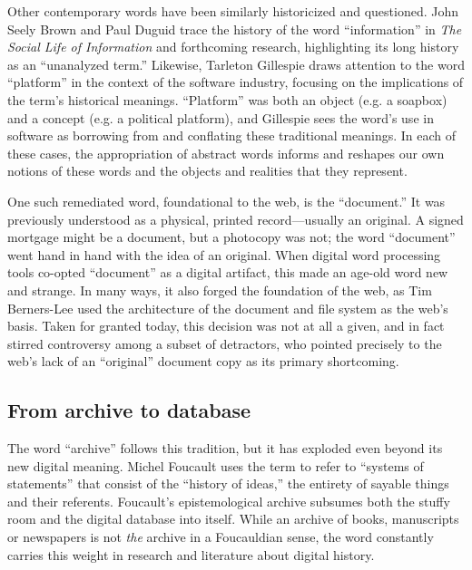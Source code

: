 Other contemporary words have been similarly historicized and questioned. John Seely Brown and Paul Duguid trace the history of the word ``information'' in \emph{The Social Life of Information} and forthcoming research, highlighting its long history as an ``unanalyzed term.''\autocite{brown_social_2002} Likewise, Tarleton Gillespie draws attention to the word ``platform'' in the context of the software industry, focusing on the implications of the term's historical meanings.\autocite{gillespie_politics_2010} ``Platform'' was both an object (e.g. a soapbox) and a concept (e.g. a political platform), and Gillespie sees the word's use in software as borrowing from and conflating these traditional meanings. In each of these cases, the appropriation of abstract words informs and reshapes our own notions of these words and the objects and realities that they represent.

One such remediated word, foundational to the web, is the ``document.'' It was previously understood as a physical, printed record---usually an original. A signed mortgage might be a document, but a photocopy was not; the word ``document'' went hand in hand with the idea of an original. When digital word processing tools co-opted ``document'' as a digital artifact, this made an age-old word new and strange. In many ways, it also forged the foundation of the web, as Tim Berners-Lee used the architecture of the document and file system as the web's basis.\autocite[37-40]{berners-lee_weaving_2000} Taken for granted today, this decision was not at all a given, and in fact stirred controversy among a subset of detractors, who pointed precisely to the web's lack of an ``original'' document copy as its primary shortcoming.\autocites[See, e.g.,][Chapter 18]{lanier_who_2013}{nelson_ted_1999}

\subsection{From archive to database}

The word ``archive'' follows this tradition, but it has exploded even beyond its new digital meaning. Michel Foucault uses the term to refer to ``systems of statements'' that consist of the ``history of ideas,'' the entirety of sayable things and their referents.\autocite[128-129, 137]{foucault_archaeology_1972} Foucault's epistemological archive subsumes both the stuffy room and the digital database into itself. While an archive of books, manuscripts or newspapers is not \emph{the} archive in a Foucauldian sense, the word constantly carries this weight in research and literature about digital history.


